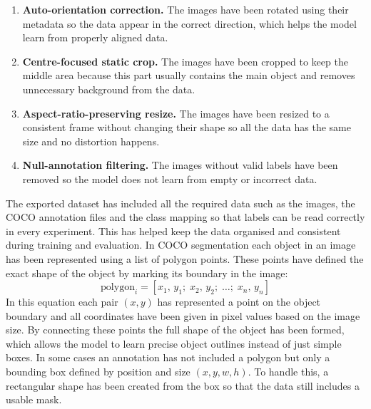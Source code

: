 \documentclass{article}
\begin{document}
\begin{enumerate}[leftmargin=2.5em, label=(\roman*)]
\item \textbf{Auto-orientation correction.} The images have been rotated using their metadata so the data appear in the correct direction, which helps the model learn from properly aligned data.
\item \textbf{Centre-focused static crop.} The images have been cropped to keep the middle area because this part usually contains the main object and removes unnecessary background from the data.
\item \textbf{Aspect-ratio-preserving resize.} The images have been resized to a consistent frame without changing their shape so all the data has the same size and no distortion happens.
\item \textbf{Null-annotation filtering.} The images without valid labels have been removed so the model does not learn from empty or incorrect data.
\end{enumerate}
The exported dataset has included all the required data such as the images, the COCO annotation files and the class mapping so that labels can be read correctly in every experiment. This has helped keep the data organised and consistent during training and evaluation. In COCO segmentation each object in an image has been represented using a list of polygon points. These points have defined the exact shape of the object by marking its boundary in the image:
\[
  \mathrm{polygon}_i = [x_1,\,y_1;\;x_2,\,y_2;\;\ldots;\;x_n,\,y_n]
\]
In this equation each pair $(x, y)$ has represented a point on the object boundary and all coordinates have been given in pixel values based on the image size. By connecting these points the full shape of the object has been formed, which allows the model to learn precise object outlines instead of just simple boxes. In some cases an annotation has not included a polygon but only a bounding box defined by position and size $(x, y, w, h)$. To handle this, a rectangular shape has been created from the box so that the data still includes a usable mask.
\end{document}

